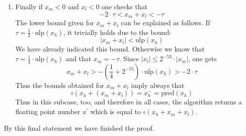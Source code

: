 \documentclass[a4paper,10pt,twoside]{article}
\newenvironment{proof}[1][Proof]{\begin{trivlist}
\item[\hskip \labelsep {\bfseries #1}]}{\end{trivlist}}
\newcommand{\qed}{\nobreak \ifvmode \relax \else \ifdim \lastskip<1.5em \hskip-\lastskip
\hskip1.5em plus0em minus0.5em \fi \nobreak \vrule height0.75em width0.5em depth0.25em\fi}
\newcommand{\hi}{\ensuremath{\mathit{h}}}
\newcommand{\mi}{\ensuremath{\mathit{m}}}
\newcommand{\lo}{\ensuremath{\mathit{l}}}
\newcommand{\mUlp}{\ensuremath{\mathrm{ulp}}}
\newcommand{\pred}{\ensuremath{\mathrm{pred}}}
\begin{document}
\begin{proof}
{\begin{enumerate}
which is the number returned by the algorithm.
\item Finally if $x_\mi < 0$ and $x_\lo < 0$ one checks that
$$-2 \cdot \tau < x_\mi + x_\lo < -\tau$$
The lower bound given for $x_\mi + x_\lo$ can be explained as follows. 
If $\tau = \frac{1}{2} \cdot \mUlp\left( x_\hi \right)$, it trivially holds due to the bound:
$$\left \vert x_\mi + x_\lo \right \vert < \mUlp\left( x_\hi \right)$$
We have already indicated this bound.
Otherwise we know that $\tau = \frac{1}{4} \cdot \mUlp\left( x_\hi \right)$ and that $x_\mi = -\tau$.
Since $\left \vert x_\lo \right \vert \leq 2^{-53} \cdot \left \vert x_\mi \right \vert$, one gets
$$x_\mi + x_\lo > - \left( \frac{1}{4} + 2^{-55} \right) \cdot \mUlp\left( x_\hi \right) > -2 \cdot \tau$$
Thus the bounds obtained for $x_\mi + x_\lo$ imply always that
$$\circ \left( x_\hi + \left( x_\mi + x_\lo \right) \right) = x_\hi^- = \pred\left( x_\hi \right)$$
Thus in this subcase, too, and therefore in all cases, the algorithm returns a floating point number $x^\prime$ 
which is equal to $\circ \left( x_\hi + x_\mi + x_\lo \right)$.
\end{enumerate}
}
By this final statement we have finished the proof.\qed
\end{proof}
\end{document}
